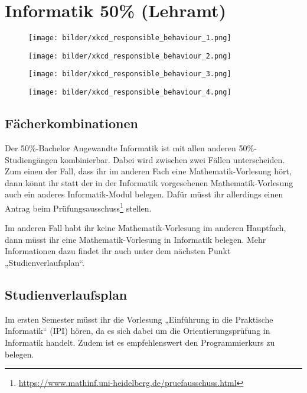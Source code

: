 \section{Informatik 50\% (Lehramt)}

\begin{figure*}[b]
    \centering
    \begin{subfigure}{.24\textwidth}
    		\centering
		\texttt{[image: bilder/xkcd\_responsible\_behaviour\_1.png]}
    \end{subfigure}
    \begin{subfigure}{.24\textwidth}
	    \centering
	    \texttt{[image: bilder/xkcd\_responsible\_behaviour\_2.png]}
    \end{subfigure}
    \begin{subfigure}{.25\textwidth}
	    \centering
	    \texttt{[image: bilder/xkcd\_responsible\_behaviour\_3.png]}
    \end{subfigure}
    \begin{subfigure}{.25\textwidth}
	    \centering
	    \texttt{[image: bilder/xkcd\_responsible\_behaviour\_4.png]}
    \end{subfigure}
\end{figure*}

\subsection{Fächerkombinationen}
Der 50\%-Bachelor Angewandte Informatik ist mit allen anderen 50\%-Studiengängen kombinierbar. Dabei wird zwischen zwei Fällen unterscheiden. Zum einen der Fall, dass ihr im anderen Fach eine Mathematik-Vorlesung hört, dann könnt ihr statt der in der Informatik vorgesehenen Mathematik-Vorlesung auch ein anderes Informatik-Modul belegen. Dafür müsst ihr allerdings einen Antrag beim Prüfungsausschuss\footnote{\url{https://www.mathinf.uni-heidelberg.de/pruefausschuss.html}} stellen. 

Im anderen Fall habt ihr keine Mathematik-Vorlesung im anderen Hauptfach, dann müsst ihr eine Mathematik-Vorlesung in Informatik belegen. Mehr Informationen dazu findet ihr auch unter dem nächsten Punkt „Studienverlaufsplan“.

\subsection{Studienverlaufsplan}
Im ersten Semester müsst ihr die Vorlesung „Einführung in die Praktische Informatik“ (\gls{IPI}) hören, da es sich dabei um die Orientierungsprüfung in Informatik handelt. Zudem ist es empfehlenswert den Programmierkurs zu belegen. 

